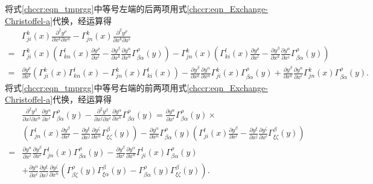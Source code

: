将式\eqref{chccr:eqn_tmprgg}中等号左端的后两项用式\eqref{chccr:eqn_Exchange-Christoffel-a}代换，经运算得
\begin{align*}
    &\Gamma^{k}_{ji}(x) \frac{\partial^2 y^\rho}{\partial x^k\partial x^n}
    -\Gamma^{k}_{jn}(x) \frac{\partial^2 y^\rho}{\partial x^k\partial x^i} \\
    =& \Gamma^{k}_{ji}(x) \left(\Gamma^{l}_{kn}(x) \frac{\partial y^\rho}{\partial x^l} -
    \frac{\partial y^\beta}{\partial x^k} \frac{\partial y^\alpha}{\partial x^n}
    \Gamma^{\rho}_{\beta\alpha}(y)\right)
    -\Gamma^{k}_{jn}(x) \left(\Gamma^{l}_{ki}(x) \frac{\partial y^\rho}{\partial x^l} -
    \frac{\partial y^\beta}{\partial x^k} \frac{\partial y^\alpha}{\partial x^i}
    \Gamma^{\rho}_{\beta\alpha}(y)\right) \\
    =& \frac{\partial y^\rho}{\partial x^l} \left(\Gamma^{k}_{ji}(x)\Gamma^{l}_{kn}(x)
     - \Gamma^{k}_{jn}(x) \Gamma^{l}_{ki}(x) \right)
     - \frac{\partial y^\beta}{\partial x^k} \frac{\partial y^\alpha}{\partial x^n}
       \Gamma^{k}_{ji}(x) \Gamma^{\rho}_{\beta\alpha}(y)
     + \frac{\partial y^\beta}{\partial x^k} \frac{\partial y^\alpha}{\partial x^i}
       \Gamma^{k}_{jn}(x)\Gamma^{\rho}_{\beta\alpha}(y) .
\end{align*}\setlength{\mathindent}{2em}
将式\eqref{chccr:eqn_tmprgg}中等号右端的前两项用式\eqref{chccr:eqn_Exchange-Christoffel-a}代换，经运算得
\begin{align*}
    &\frac{\partial^2 y^\beta}{\partial x^j\partial x^n}
    \frac{\partial y^\alpha}{\partial x^i} \Gamma^{\rho}_{\beta\alpha}(y)
    -  \frac{\partial^2 y^\beta}{\partial x^j\partial x^i}
    \frac{\partial y^\alpha}{\partial x^n} \Gamma^{\rho}_{\beta\alpha}(y)
    =\frac{\partial y^\alpha}{\partial x^i}\Gamma^{\rho}_{\beta\alpha}(y) \times \\
    &\left(\Gamma^{l}_{jn}(x) \frac{\partial y^\beta}{\partial x^l} -
      \frac{\partial y^\xi}{\partial x^j} \frac{\partial y^\zeta}{\partial x^n}
      \Gamma^{\beta}_{\xi\zeta}(y) \right)
    -\frac{\partial y^\alpha}{\partial x^n}\Gamma^{\rho}_{\beta\alpha}(y)
     \left(\Gamma^{l}_{ji}(x) \frac{\partial y^\beta}{\partial x^l} -
     \frac{\partial y^\xi}{\partial x^j} \frac{\partial y^\zeta}{\partial x^i}
     \Gamma^{\beta}_{\xi\zeta}(y) \right) \\
     =& \frac{\partial y^\alpha}{\partial x^i} \frac{\partial y^\beta}{\partial x^l}
        \Gamma^{l}_{jn}(x)\Gamma^{\rho}_{\beta\alpha}(y)
      - \frac{\partial y^\beta}{\partial x^l}\frac{\partial y^\alpha}{\partial x^n}
        \Gamma^{l}_{ji}(x) \Gamma^{\rho}_{\beta\alpha}(y) \\
      & +  \frac{\partial y^\alpha}{\partial x^i}
      \frac{\partial y^\xi}{\partial x^j}  \frac{\partial y^\zeta}{\partial x^n}
      \left(\Gamma^{\rho}_{\beta\zeta}(y) \Gamma^{\beta}_{\xi\alpha}(y)
      -\Gamma^{\rho}_{\beta\alpha}(y) \Gamma^{\beta}_{\xi\zeta}(y)\right) .
\end{align*}
